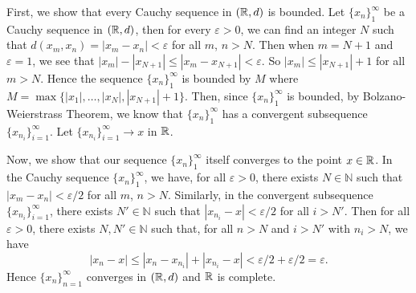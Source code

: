 
\begin{solution}
    First, we show that every Cauchy sequence in 
    $(\mathbb{R},d)$ is bounded.
    Let $\{x_n\}_1^\infty$ be a Cauchy sequence
    in $(\mathbb{R},d)$, then for every $\varepsilon>0$,
    we can find an integer $N$ such that
    $d(x_m,x_n)=|x_m-x_n|<\varepsilon$ 
    for all $m$, $n>N$. Then when $m=N+1$
    and $\varepsilon=1$, we see
    that $|x_m|-|x_{N+1}|\leq|x_m-x_{N+1}|
    <\varepsilon$. So $|x_m|\leq |x_{N+1}| +1$
    for all $m>N$. Hence the sequence
    $\{x_n\}_1^\infty$ is bounded by $M$ where
    $M=\max\{|x_1|,\ldots,|x_N|, |x_{N+1}|+1\}$.
    Then, since $\{x_n\}_1^\infty$ is bounded,
    by Bolzano-Weierstrass Theorem, we know that
    $\{x_n\}_1^\infty$ has a convergent
    subsequence $\{x_{n_i}\}_{i=1}^\infty$.
    Let $\{x_{n_i}\}_{i=1}^\infty\to x$ in $\mathbb{R}$.

    \vspace*{3mm}
    Now, we show that our sequence
    $\{x_n\}_1^\infty$ itself converges to the
    point $x\in \mathbb{R}$. In the Cauchy sequence
    $\{x_n\}_1^\infty$, we have, for all
    $\varepsilon>0$, there exists
    $N\in \mathbb{N}$ such that
    $|x_m-x_n|<\varepsilon/2$ for all $m$, $n>N$.
    Similarly, in the convergent subsequence
    $\{x_{n_i}\}_{i=1}^\infty$, there exists
    $N'\in \mathbb{N}$ such that
    $|x_{n_i}-x|<\varepsilon/2$ for all
    $i>N'$. Then for all $\varepsilon>0$, there
    exists $N,N'\in \mathbb{N}$ such that,
    for all $n>N$ and $i>N'$ with $n_i>N$, we have
    $$|x_n-x|\leq |x_n-x_{n_i}|+|x_{n_i}-x|
    <\varepsilon/2+\varepsilon/2=\varepsilon.$$
    Hence $\{x_{n}\}_{n=1}^\infty$ converges in
    $(\mathbb{R},d)$ and $\mathbb{R}$ is complete.
\end{solution}